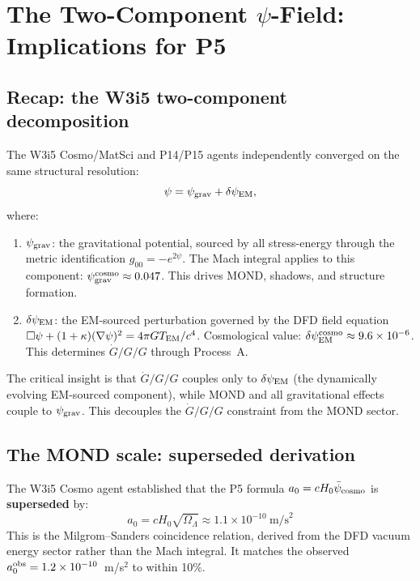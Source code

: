 \documentclass[11pt]{article}
\newcommand{\ee}[1]{\times 10^{#1}}
\newcommand{\psicosmo}{\bar{\psi}_{\rm cosmo}}
\newcommand{\psigrav}{\psi_{\rm grav}}
\newcommand{\dpsiEM}{\delta\psi_{\rm EM}}
\newcommand{\Hzero}{H_0}
\newcommand{\aM}{a_0}
\newcommand{\Gdot}{\dot{G}/G}
\newcommand{\OmL}{\Omega_\Lambda}
\begin{document}
\section{The Two-Component $\psi$-Field: Implications for P5}
\label{sec:two-comp-P5}

\subsection{Recap: the W3i5 two-component decomposition}

The W3i5 Cosmo/MatSci and P14/P15 agents independently converged on the
same structural resolution:
\begin{equation}
\psi = \psigrav + \dpsiEM,
\label{eq:two-comp}
\end{equation}
where:
\begin{enumerate}[nosep]
\item $\psigrav$: the gravitational potential, sourced by all stress-energy
  through the metric identification $g_{00} = -e^{2\psi}$. The Mach
  integral applies to this component:
  $\psigrav^{\rm cosmo} \approx 0.047$. This drives MOND, shadows, and
  structure formation.
\item $\dpsiEM$: the EM-sourced perturbation governed by the DFD field
  equation $\Box\psi + (1+\kappa)(\nabla\psi)^2 = 4\pi G T_{\rm EM}/c^4$.
  Cosmological value: $\dpsiEM^{\rm cosmo} \approx 9.6\ee{-6}$.
  This determines $\Gdot/G$ through Process~A.
\end{enumerate}

The critical insight is that $\Gdot/G$ couples only to $\dpsiEM$
(the dynamically evolving EM-sourced component), while MOND and all
gravitational effects couple to $\psigrav$. This decouples the
$\Gdot/G$ constraint from the MOND sector.

\subsection{The MOND scale: superseded derivation}

The W3i5 Cosmo agent established that the P5 formula
$\aM = c\Hzero\psicosmo$ is \textbf{superseded} by:
\begin{equation}
\boxed{\aM = c\Hzero\sqrt{\OmL} \approx 1.1\ee{-10}~\text{m/s}^2}
\label{eq:a0-new}
\end{equation}
This is the Milgrom--Sanders coincidence relation, derived from the
DFD vacuum energy sector rather than the Mach integral. It matches
the observed $\aM^{\rm obs} = 1.2\ee{-10}$~m/s$^2$ to within 10\%.
\end{document}
